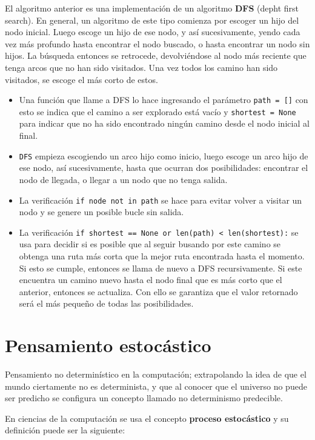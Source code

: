 El algoritmo anterior es una implementación de un algoritmo \textbf{DFS} (depht first search). En general, un algoritmo de este tipo comienza por escoger un hijo del nodo inicial. Luego escoge un hijo de ese nodo, y así sucesivamente, yendo cada vez más profundo hasta encontrar el nodo buscado, o hasta encontrar un nodo sin hijos. La búsqueda entonces se retrocede, devolviéndose al nodo más reciente que tenga arcos que no han sido visitados. Una vez todos los camino han sido visitados, se escoge el más corto de estos. 

\begin{itemize}
    \item Una función que llame a DFS lo hace ingresando el parámetro \texttt{path = []} con esto se indica que el camino a ser explorado está vacío y \texttt{shortest = None} para indicar que no ha sido encontrado ningún camino desde el nodo inicial al final.
    \item \texttt{DFS} empieza escogiendo un arco hijo como inicio, luego escoge un arco hijo de ese nodo, así sucesivamente, hasta que ocurran dos posibilidades: encontrar el nodo de llegada, o llegar a un nodo que no tenga salida.
    \item La verificación \texttt{if node not in path} se hace para evitar volver a visitar un nodo y se genere un posible bucle sin salida.
    \item La verificación \texttt{if shortest == None or len(path) < len(shortest):} se usa para decidir si es posible que al seguir busando por este camino se obtenga una ruta más corta que la mejor ruta encontrada hasta el momento. Si esto se cumple, entonces se llama de nuevo a DFS recursivamente. Si este encuentra un camino nuevo hasta el nodo final que es más corto que el anterior, entonces se actualiza. Con ello se garantiza que el valor retornado será el más pequeño de todas las posibilidades. 
\end{itemize}

\section{Pensamiento estocástico}

Pensamiento no determinístico en la computación; extrapolando la idea de que el mundo ciertamente no es determinista, y que al conocer que el universo no puede ser predicho se configura un concepto llamado no determinismo predecible.

En ciencias de la computación se usa el concepto \textbf{proceso estocástico} y su definición puede ser la siguiente:

